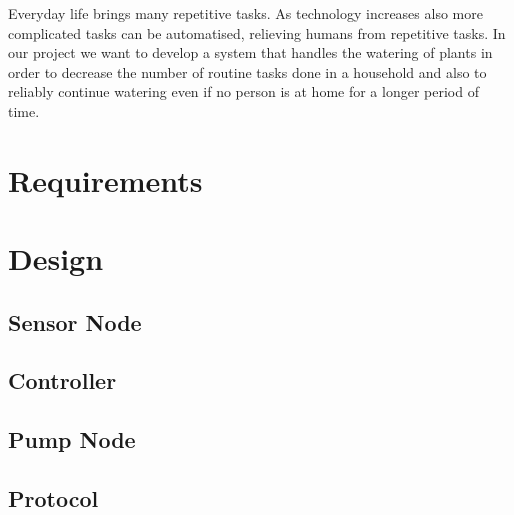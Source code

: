 \documentclass[12pt,a4paper,titlepage,oneside]{article}
\begin{document}
 
\maketitle



 
 
Everyday life brings many repetitive tasks. As technology increases also more complicated tasks can be automatised, relieving humans from repetitive tasks. In our project we want to develop a system that handles the watering of plants in order to decrease the number of routine tasks done in a household and also to reliably continue watering even if no person is at home for a longer period of time.

\section{Requirements}



\section{Design}

\subsection{Sensor Node}


\subsection{Controller}


\subsection{Pump Node}


\subsection{Protocol}

\end{document}
